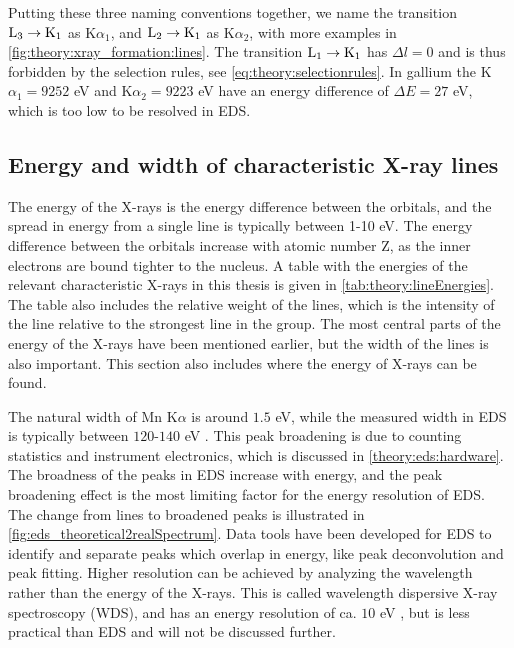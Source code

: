 Putting these three naming conventions together, we name the transition $\textnormal{L}_3 \rightarrow \textnormal{K}_1$ as K$\alpha_1$, and $\textnormal{L}_2 \rightarrow \textnormal{K}_1$ as K$\alpha_2$, with more examples in \cref{fig:theory:xray_formation:lines}.
The transition $\textnormal{L}_1 \rightarrow \textnormal{K}_1$ has $\Delta l =  0$ and is thus forbidden by the selection rules, see \cref{eq:theory:selectionrules}.
In gallium the K$\alpha_1 = 9252$ eV and K$\alpha_2 = 9223$ eV \cite{thompson_x-ray_2004} have an energy difference of $\Delta E = 27$ eV, which is too low to be resolved in EDS.




\subsection{Energy and width of characteristic X-ray lines}
\label{theory:xray_formation:energy}


The energy of the X-rays is the energy difference between the orbitals, and the spread in energy from a single line is typically between 1-10 eV.
The energy difference between the orbitals increase with atomic number Z, as the inner electrons are bound tighter to the nucleus.
A table with the energies of the relevant characteristic X-rays in this thesis is given in \cref{tab:theory:lineEnergies}.
The table also includes the relative weight of the lines, which is the intensity of the line relative to the strongest line in the group.
The most central parts of the energy of the X-rays have been mentioned earlier, but the width of the lines is also important.
This section also includes where the energy of X-rays can be found.


The natural width of Mn K$\alpha$ is around $1.5$ eV, while the measured width in EDS is typically between $120$-$140$ eV \cite[Ch. 16.1.1]{goldstein_scanning_2018}.
This peak broadening is due to counting statistics and instrument electronics, which is discussed in \cref{theory:eds:hardware}.
The broadness of the peaks in EDS increase with energy, and the peak broadening effect is the most limiting factor for the energy resolution of EDS.
The change from lines to broadened peaks is illustrated in \cref{fig:eds_theoretical2realSpectrum}.
Data tools have been developed for EDS to identify and separate peaks which overlap in energy, like peak deconvolution and peak fitting.
Higher resolution can be achieved by analyzing the wavelength rather than the energy of the X-rays.
This is called wavelength dispersive X-ray spectroscopy (WDS), and has an energy resolution of ca. $10$ eV \cite{goldstein_scanning_2018,williams_carter_tem_2009}, but is less practical than EDS and will not be discussed further.


